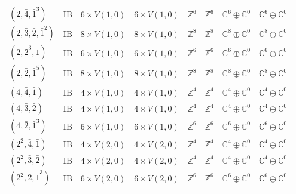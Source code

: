 \documentclass[11pt,a4paper]{article}
\begin{document}
\begin{appendix}
\begin{table}
\begin{tabular}{C{2.65cm}C{0.85cm}C{3.0cm}C{3.0cm}C{2.25cm}C{2.25cm}C{1.55cm}C{1.55cm}}
\((2, \bar{4}, \bar{1}^{3})\) & \(\mathrm{IB}\) & \(6 \times V(1,0)\) & \(6 \times V(1,0)\) & \(\mathbb{Z}^{6}\) & \(\mathbb{Z}^{6}\) & \(\mathbb{C}^{6} \oplus \mathbb{C}^{0}\) & \(\mathbb{C}^{6} \oplus \mathbb{C}^{0}\) \\
\((2, \bar{3}, \bar{2}, \bar{1}^{2})\) & \(\mathrm{IB}\) & \(8 \times V(1,0)\) & \(8 \times V(1,0)\) & \(\mathbb{Z}^{8}\) & \(\mathbb{Z}^{8}\) & \(\mathbb{C}^{8} \oplus \mathbb{C}^{0}\) & \(\mathbb{C}^{8} \oplus \mathbb{C}^{0}\) \\
\((2, \bar{2}^{3}, \bar{1})\) & \(\mathrm{IB}\) & \(6 \times V(1,0)\) & \(6 \times V(1,0)\) & \(\mathbb{Z}^{6}\) & \(\mathbb{Z}^{6}\) & \(\mathbb{C}^{6} \oplus \mathbb{C}^{0}\) & \(\mathbb{C}^{6} \oplus \mathbb{C}^{0}\) \\
\((2, \bar{2}, \bar{1}^{5})\) & \(\mathrm{IB}\) & \(8 \times V(1,0)\) & \(8 \times V(1,0)\) & \(\mathbb{Z}^{8}\) & \(\mathbb{Z}^{8}\) & \(\mathbb{C}^{8} \oplus \mathbb{C}^{0}\) & \(\mathbb{C}^{8} \oplus \mathbb{C}^{0}\) \\
\((4, \bar{4}, \bar{1})\) & \(\mathrm{IB}\) & \(4 \times V(1,0)\) & \(4 \times V(1,0)\) & \(\mathbb{Z}^{4}\) & \(\mathbb{Z}^{4}\) & \(\mathbb{C}^{4} \oplus \mathbb{C}^{0}\) & \(\mathbb{C}^{4} \oplus \mathbb{C}^{0}\) \\
\((4, \bar{3}, \bar{2})\) & \(\mathrm{IB}\) & \(4 \times V(1,0)\) & \(4 \times V(1,0)\) & \(\mathbb{Z}^{4}\) & \(\mathbb{Z}^{4}\) & \(\mathbb{C}^{4} \oplus \mathbb{C}^{0}\) & \(\mathbb{C}^{4} \oplus \mathbb{C}^{0}\) \\
\((4, \bar{2}, \bar{1}^{3})\) & \(\mathrm{IB}\) & \(6 \times V(1,0)\) & \(6 \times V(1,0)\) & \(\mathbb{Z}^{6}\) & \(\mathbb{Z}^{6}\) & \(\mathbb{C}^{6} \oplus \mathbb{C}^{0}\) & \(\mathbb{C}^{6} \oplus \mathbb{C}^{0}\) \\
\((2^{2}, \bar{4}, \bar{1})\) & \(\mathrm{IB}\) & \(4 \times V(2,0)\) & \(4 \times V(2,0)\) & \(\mathbb{Z}^{4}\) & \(\mathbb{Z}^{4}\) & \(\mathbb{C}^{4} \oplus \mathbb{C}^{0}\) & \(\mathbb{C}^{4} \oplus \mathbb{C}^{0}\) \\
\((2^{2}, \bar{3}, \bar{2})\) & \(\mathrm{IB}\) & \(4 \times V(2,0)\) & \(4 \times V(2,0)\) & \(\mathbb{Z}^{4}\) & \(\mathbb{Z}^{4}\) & \(\mathbb{C}^{4} \oplus \mathbb{C}^{0}\) & \(\mathbb{C}^{4} \oplus \mathbb{C}^{0}\) \\
\((2^{2}, \bar{2}, \bar{1}^{3})\) & \(\mathrm{IB}\) & \(6 \times V(2,0)\) & \(6 \times V(2,0)\) & \(\mathbb{Z}^{6}\) & \(\mathbb{Z}^{6}\) & \(\mathbb{C}^{6} \oplus \mathbb{C}^{0}\) & \(\mathbb{C}^{6} \oplus \mathbb{C}^{0}\) \\

\end{tabular}
\end{table}
\end{appendix}
\end{document}

